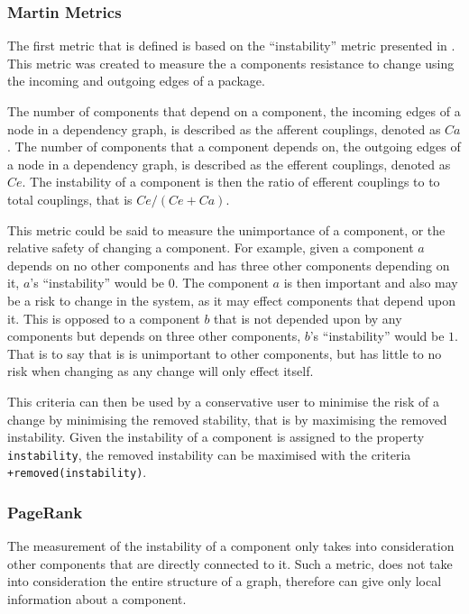 \subsubsection{Martin Metrics}
The first metric that is defined is based on the ``instability'' metric presented in \citep{martin2003}.
This metric was created to measure the a components resistance to change using the incoming and outgoing edges of a package.

\begin{defs}
The number of components that depend on a component, the incoming edges of a node in a dependency graph, is described as the afferent couplings, denoted as $Ca$.
The number of components that a component depends on, the outgoing edges of a node in a dependency graph, is described as the efferent couplings, denoted as $Ce$. 
The instability of a component is then the ratio of efferent couplings to to total couplings, that is $Ce/(Ce+Ca)$.
\end{defs}

This metric could be said to measure the unimportance of a component, or the relative safety of changing a component.
For example, given a component $a$ depends on no other components and has three other components depending on it, $a$'s ``instability'' would be $0$.
The component $a$ is then important and also may be a risk to change in the system, as it may effect components that depend upon it.
This is opposed to a component $b$ that is not depended upon by any components but depends on three other components, $b$'s ``instability'' would be $1$.
That is to say that is is unimportant to other components, but has little to no risk when changing as any change will only effect itself.

This criteria can then be used by a conservative user to minimise the risk of a change by minimising the removed stability,
that is by maximising the removed instability.
Given the instability of a component is assigned to the property \verb+instability+,
the removed instability can be maximised with the criteria \verb!+removed(instability)!.

\subsubsection{PageRank}
The measurement of the instability of a component only takes into consideration other components that are directly connected to it.
Such a metric, does not take into consideration the entire structure of a graph, therefore can give only local information about a component.

